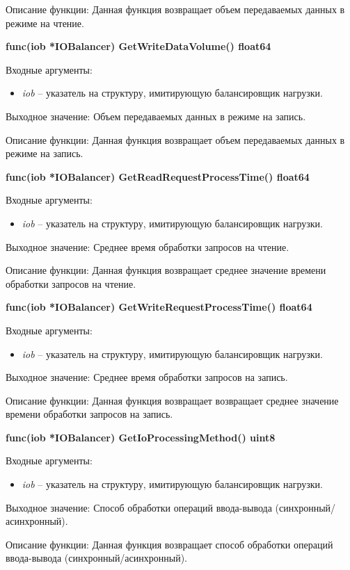 Описание функции: Данная функция возвращает объем передаваемых данных в режиме на чтение.

\textbf{func(iob *IOBalancer) GetWriteDataVolume() float64}

Входные аргументы:
\begin{itemize}
	\item \textit{iob} -- указатель на структуру, имитирующую балансировщик нагрузки. 
\end{itemize}

Выходное значение: Объем передаваемых данных в режиме на запись. 

Описание функции: Данная функция возвращает объем передаваемых данных в режиме на запись.

\textbf{func(iob *IOBalancer) GetReadRequestProcessTime() float64}

Входные аргументы:
\begin{itemize}
	\item \textit{iob} -- указатель на структуру, имитирующую балансировщик нагрузки. 
\end{itemize}
Выходное значение: Среднее время обработки запросов на чтение.

Описание функции: Данная функция возвращает среднее значение времени обработки запросов на чтение.

\textbf{func(iob *IOBalancer) GetWriteRequestProcessTime() float64}

Входные аргументы:
\begin{itemize}
	\item \textit{iob} -- указатель на структуру, имитирующую балансировщик нагрузки. 
\end{itemize}

Выходное значение: Среднее время обработки запросов на запись.

Описание функции: Данная функция возвращает возвращает среднее значение времени обработки запросов на запись.

\textbf{func(iob *IOBalancer) GetIoProcessingMethod() uint8}

Входные аргументы:
\begin{itemize}
	\item \textit{iob} -- указатель на структуру, имитирующую балансировщик нагрузки. 
\end{itemize}

Выходное значение: Способ обработки операций ввода-вывода (синхронный/асинхронный).

Описание функции: Данная функция возвращает способ обработки операций ввода-вывода (синхронный/асинхронный).

